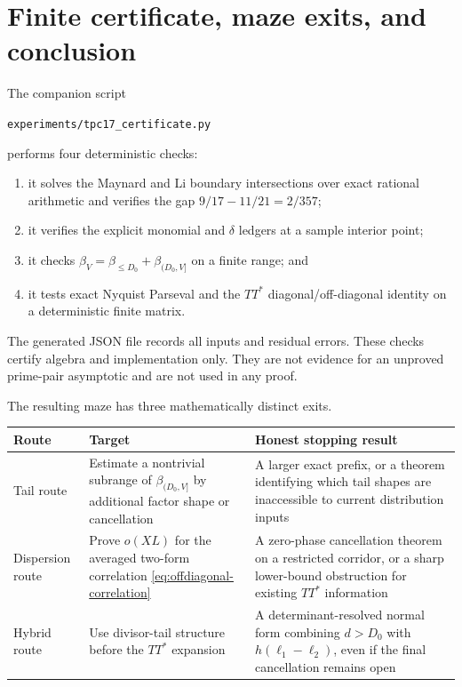 \section{Finite certificate, maze exits, and conclusion}
\label{sec:computation}

The companion script
\begin{center}
\texttt{experiments/tpc17\_certificate.py}
\end{center}
performs four deterministic checks:
\begin{enumerate}
 \item it solves the Maynard and Li boundary intersections over exact
 rational arithmetic and verifies the gap $9/17-11/21=2/357$;
 \item it verifies the explicit monomial and $\delta$ ledgers at a
 sample interior point;
 \item it checks
 $\beta_V=\beta_{\le D_0}+\beta_{(D_0,V]}$ on a finite range; and
 \item it tests exact Nyquist Parseval and the $TT^*$ diagonal/off-diagonal
 identity on a deterministic finite matrix.
\end{enumerate}
The generated JSON file records all inputs and residual errors.  These
checks certify algebra and implementation only.  They are not evidence
for an unproved prime-pair asymptotic and are not used in any proof.

The resulting maze has three mathematically distinct exits.

\begin{center}
\small
\begin{tabular}{p{}p{}p{}}
\toprule
Route & Target & Honest stopping result \\
\midrule
Tail route & Estimate a nontrivial subrange of
$\beta_{(D_0,V]}$ by additional factor shape or cancellation &
A larger exact prefix, or a theorem identifying which tail shapes are
inaccessible to current distribution inputs \\
Dispersion route & Prove $o(XL)$ for the averaged two-form correlation
\eqref{eq:offdiagonal-correlation} &
A zero-phase cancellation theorem on a restricted corridor, or a sharp
lower-bound obstruction for existing $TT^*$ information \\
Hybrid route & Use divisor-tail structure before the $TT^*$ expansion &
A determinant-resolved normal form combining $d>D_0$ with
$h(\ell_1-\ell_2)$, even if the final cancellation remains open \\
\bottomrule
\end{tabular}
\end{center}


